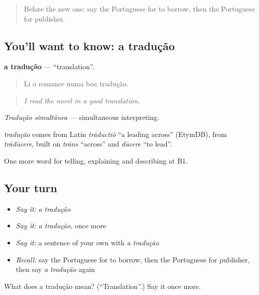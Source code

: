 \begin{quote}
Before the new one: say the Portuguese for to borrow, then the Portuguese for publisher.
\end{quote}

\subsection*{You'll want to know: a tradução}
\textbf{a tradução} — \textquotedblleft{}translation\textquotedblright{}.

\begin{quote}
Li o romance numa boa tradução.
\end{quote}

\begin{quote}
\emph{I read the novel in a good translation.}
\end{quote}

\emph{Tradução simultânea} — simultaneous interpreting.

\begin{cousinweb}
\emph{tradução} comes from Latin \emph{trāductiō} \textquotedblleft{}a leading across\textquotedblright{} (EtymDB), from \emph{trādūcere}, built on \emph{trāns} \textquotedblleft{}across\textquotedblright{} and \emph{dūcere} \textquotedblleft{}to lead\textquotedblright{}.
\end{cousinweb}

\begin{grammarlens}[title={What you've built}]
One more word for telling, explaining and describing at B1.
\end{grammarlens}

\subsection*{Your turn}
\begin{itemize}
\raggedright
  \item \emph{Say it:} \emph{a tradução}
  \item \emph{Say it:} \emph{a tradução}, once more
  \item \emph{Say it:} a sentence of your own with \emph{a tradução}
  \item \emph{Recall:} say the Portuguese for to borrow, then the Portuguese for publisher, then say \emph{a tradução} again
\end{itemize}

\begin{tcolorbox}[breakable,colback=teal!4,colframe=teal!35!black,title={Before you move on}]
What does a tradução mean? (\textquotedblleft{}Translation\textquotedblright{}.) Say it once more.
\end{tcolorbox}
